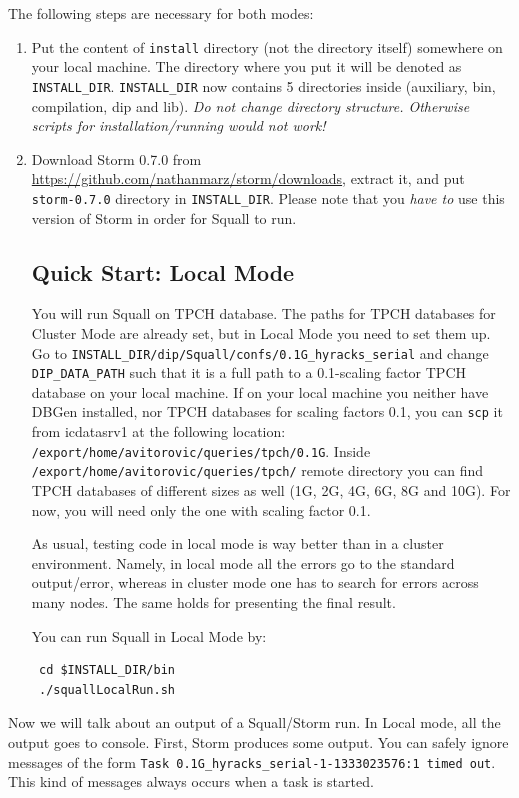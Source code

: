 \documentclass[a4paper,10pt]{article}
\begin{document}
The following steps are necessary for both modes:
\begin{enumerate}
 \item Put the content of \verb#install# directory (not the directory itself) somewhere on your local machine. The directory where you put it will be denoted as \verb#INSTALL_DIR#. \verb#INSTALL_DIR# now contains 5 directories inside (auxiliary, bin, compilation, dip and lib). \textit{Do not change directory structure. Otherwise scripts for installation/running would not work!}
 \item Download Storm 0.7.0 from \url{https://github.com/nathanmarz/storm/downloads}, extract it, and put \verb#storm-0.7.0# directory in \verb#INSTALL_DIR#. Please note that you \textit{have to} use this version of Storm in order for Squall to run.
 
\subsection{Quick Start: Local Mode}
You will run Squall on TPCH database. The paths for TPCH databases for Cluster Mode are already set, but in Local Mode you need to set them up. Go to \verb#INSTALL_DIR/dip/Squall/confs/0.1G_hyracks_serial# and change \verb#DIP_DATA_PATH# such that it is a full path to a 0.1-scaling factor TPCH database on your local machine. If on your local machine you neither have DBGen installed, nor TPCH databases for scaling factors 0.1, you can \verb#scp# it from icdatasrv1 at the following location: \\ \verb#/export/home/avitorovic/queries/tpch/0.1G#. Inside \\ \verb#/export/home/avitorovic/queries/tpch/# remote directory you can find TPCH databases of different sizes as well (1G, 2G, 4G, 6G, 8G and 10G). For now, you will need only the one with scaling factor 0.1.

As usual, testing code in local mode is way better than in a cluster environment. Namely, in local mode all the errors go to the standard output/error, whereas in cluster mode one has to search for errors across many nodes. The same holds for presenting the final result.

You can run Squall in Local Mode by:
\begin{verbatim}
 cd $INSTALL_DIR/bin
 ./squallLocalRun.sh
\end{verbatim}
\end{enumerate}

Now we will talk about an output of a Squall/Storm run. In Local mode, all the output goes to console. First, Storm produces some output. You can safely ignore messages of the form \verb#Task 0.1G_hyracks_serial-1-1333023576:1 timed out#. This kind of messages always occurs when a task is started.
\end{document}
